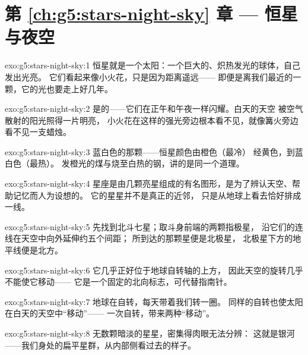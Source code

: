 \section*{第 \ref{ch:g5:stars-night-sky} 章 --- 恒星与夜空}

\begin{solution}{exo:g5:stars-night-sky:1}
恒星就是一个太阳：一个巨大的、炽热发光的球体，自己发出光亮。
它们看起来像小火花，只是因为距离遥远——
即便是离我们最近的一颗，它的光也要走上好几年。
\end{solution}

\begin{solution}{exo:g5:stars-night-sky:2}
是的——它们在正午和午夜一样闪耀。白天的天空
被空气散射的阳光照得一片明亮，
小火花在这样的强光旁边根本看不见，就像篝火旁边看不见一支蜡烛。
\end{solution}

\begin{solution}{exo:g5:stars-night-sky:3}
蓝白色的那颗——恒星颜色由橙色（最冷）
经黄色，到蓝白色（最热）。
发橙光的煤与烧至白热的钢，讲的是同一个道理。
\end{solution}

\begin{solution}{exo:g5:stars-night-sky:4}
星座是由几颗亮星组成的有名图形，是为了辨认天空、帮助记忆而人为设想的。
它的星星并不是真正的近邻，
只是从地球上看去恰好排成一线。
\end{solution}

\begin{solution}{exo:g5:stars-night-sky:5}
先找到北斗七星；取斗身前端的两颗指极星，
沿它们的连线在天空中向外延伸约五个间距；
所到达的那颗星便是北极星，
北极星下方的地平线便是北方。
\end{solution}

\begin{solution}{exo:g5:stars-night-sky:6}
它几乎正好位于地球自转轴的上方，
因此天空的旋转几乎不能使它移动——
它是一个固定的北向标志，可代替指南针。
\end{solution}

\begin{solution}{exo:g5:stars-night-sky:7}
地球在自转，每天带着我们转一圈。
同样的自转也使太阳在白天的天空中“移动”——
一次自转，带来两种“移动”。
\end{solution}

\begin{solution}{exo:g5:stars-night-sky:8}
无数颗暗淡的星星，密集得肉眼无法分辨：
这就是银河——我们身处的扁平星群，从内部侧看过去的样子。
\end{solution}

